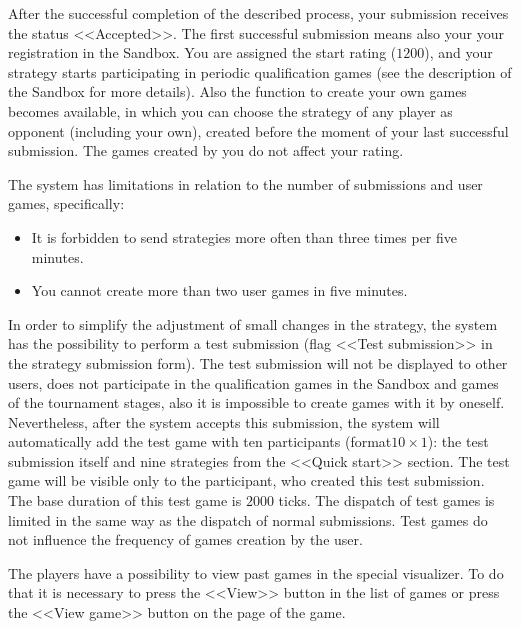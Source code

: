 After the successful completion of the described process, your submission receives the status <<Accepted>>. The first successful submission means also your
your registration in the Sandbox. You are assigned the start rating ($1200$), and your strategy starts participating in periodic
qualification games (see the description of the Sandbox for more details). Also the function to create
your own games becomes available, in which you can choose the strategy of any player as opponent (including your own), created before
the moment of your last successful submission. The games created by you do not affect your rating.
 
The system has limitations in relation to the number of submissions and user games, specifically:
\vspace{-0.15in}
\begin{itemize}
 \item It is forbidden to send strategies more often than three times per five minutes.
\vspace{-0.10in}
 \item You cannot create more than two user games in five minutes.
\vspace{-0.10in}
\end{itemize}
 
In order to simplify the adjustment of small changes in the strategy, the system has the possibility to perform a test submission (flag <<Test submission>>
in the strategy submission form). The test submission will not be displayed to other users, does not participate in the qualification games in the Sandbox and
games of the tournament stages, also it is impossible to create games with it by oneself. Nevertheless, after the system accepts this submission, the system
will automatically add the test game with ten participants (format$10\times1$): the test submission itself and nine strategies from
the <<Quick start>> section. The test game will be visible only to the participant, who created this test submission. The base duration of this test
game is $2000$ ticks. The dispatch of test games is limited in the same way as the dispatch of normal submissions. Test games do not influence
the frequency of games creation by the user.
 
The players have a possibility to view past games in the special visualizer. To do that it is necessary to press the <<View>> button in the list of games
or press the <<View game>> button on the page of the game.
 
